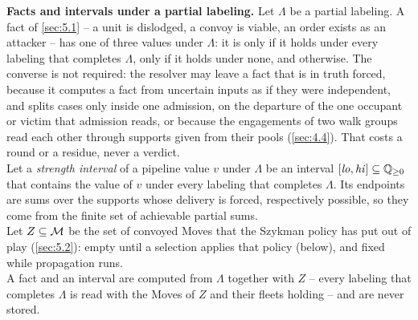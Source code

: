 \documentclass[12pt,a4paper]{article}
\begin{document}
\textbf{Facts and intervals under a partial labeling.}
Let $\Lambda$ be a partial labeling.
A fact of \cref{sec:5.1} -- a unit is dislodged, a convoy is viable, an order exists as an attacker -- has one of three values under $\Lambda$: it is  only if it holds under every labeling that completes $\Lambda$,  only if it holds under none, and  otherwise.
The converse is not required: the resolver may leave  a fact that is in truth forced, because it computes a fact from uncertain inputs as if they were independent, and splits cases only inside one admission, on the departure of the one occupant or victim that admission reads, or because the engagements of two walk groups read each other through supports given from their pools (\cref{sec:4.4}).
That costs a round or a residue, never a verdict.\\
Let a \emph{strength interval} of a pipeline value $v$ under $\Lambda$ be an interval $[\mathit{lo}, \mathit{hi}] \subseteq \mathbb{Q}_{\ge 0}$ that contains the value of $v$ under every labeling that completes $\Lambda$.
Its endpoints are sums over the supports whose delivery is forced, respectively possible, so they come from the finite set of achievable partial sums.\\
Let $Z \subseteq \mathcal{M}$ be the set of convoyed Moves that the Szykman policy has put out of play (\cref{sec:5.2}): empty until a selection applies that policy (below), and fixed while propagation runs.\\
A fact and an interval are computed from $\Lambda$ together with $Z$ -- every labeling that completes $\Lambda$ is read with the Moves of $Z$ and their fleets holding -- and are never stored.
\end{document}
